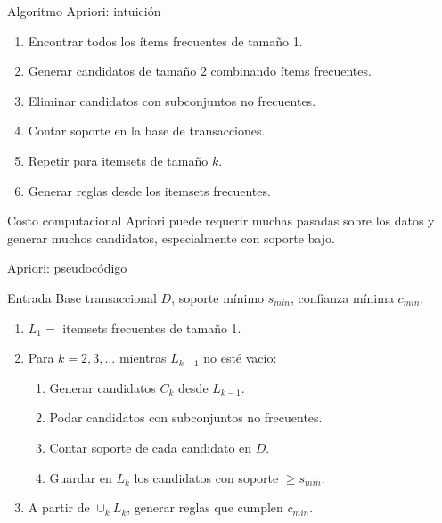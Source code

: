 \documentclass[10pt,aspectratio=169]{beamer}
\begin{document}
\begin{frame}{Algoritmo Apriori: intuición}
\begin{enumerate}
  \item Encontrar todos los ítems frecuentes de tamaño 1.
  \item Generar candidatos de tamaño 2 combinando ítems frecuentes.
  \item Eliminar candidatos con subconjuntos no frecuentes.
  \item Contar soporte en la base de transacciones.
  \item Repetir para itemsets de tamaño $k$.
  \item Generar reglas desde los itemsets frecuentes.
\end{enumerate}

\begin{alertblock}{Costo computacional}
Apriori puede requerir muchas pasadas sobre los datos y generar muchos candidatos, especialmente con soporte bajo.
\end{alertblock}
\end{frame}

\begin{frame}{Apriori: pseudocódigo}
\begin{block}{Entrada}
Base transaccional $D$, soporte mínimo $s_{min}$, confianza mínima $c_{min}$.
\end{block}

\begin{enumerate}
  \item $L_1 =$ itemsets frecuentes de tamaño 1.
  \item Para $k=2,3,\ldots$ mientras $L_{k-1}$ no esté vacío:
  \begin{enumerate}
    \item Generar candidatos $C_k$ desde $L_{k-1}$.
    \item Podar candidatos con subconjuntos no frecuentes.
    \item Contar soporte de cada candidato en $D$.
    \item Guardar en $L_k$ los candidatos con soporte $\geq s_{min}$.
  \end{enumerate}
  \item A partir de $\cup_k L_k$, generar reglas que cumplen $c_{min}$.
\end{enumerate}
\end{frame}
\end{document}
